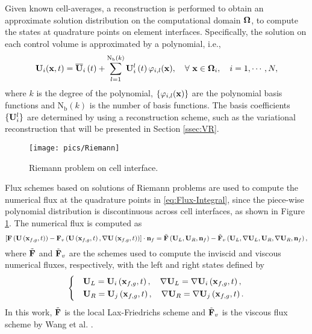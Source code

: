Given known cell-averages, a reconstruction is performed to obtain an approximate solution distribution on the computational domain $\mathbf{\Omega}$, to compute the states at quadrature points on element interfaces. Specifically, the solution on each control volume is approximated by a polynomial, i.e.,
\begin{equation}
    \label{eq:FVRec}
    \mathbf{U}_i(\mathbf{x},t) = \overline{\mathbf{U}}_i \left(t\right) + \sum_{l=1}^{\mathrm{N_b}(k)}{\mathbf{U}_i^l \left(t\right) \varphi_{i,l}(\mathbf{x}) }, \quad \forall \ \mathbf{x} \in \mathbf{\Omega}_i, \quad i=1, \cdots, N,
\end{equation}
where $k$ is the degree of the polynomial, $\{\varphi_{i,l}(\mathbf{x})\}$ are the polynomial basis functions and $\mathrm{N_b}(k)$ is the number of basis functions. The basis coefficients $\{\mathbf{U}^l_i\}$ are determined by using a reconstruction scheme, such as the variational reconstruction \cite{wang2017compact_VR} that will be presented in Section \ref{ssec:VR}. 

\begin{figure}[htbp!]
	\centering
	\texttt{[image: pics/Riemann]}
	\caption{Riemann problem on cell interface.}
	\label{fig:Riemann}
\end{figure}

Flux schemes based on solutions of Riemann problems are used to compute the numerical flux at the quadrature points in \eqref{eq:Flux-Integral}, since the piece-wise polynomial distribution is discontinuous across cell interfaces, as shown in Figure \ref{fig:Riemann}.  
The numerical flux is computed as
\begin{equation}
	\label{eq:num-flux}
	\left[\mathbf{F} \left(\mathbf{U} \left(\mathbf{x}_{f,g},t\right)\right) - \mathbf{F}_v \left(\mathbf{U}\left(\mathbf{x}_{f,g},t\right), \nabla \mathbf{U} \left(\mathbf{x}_{f,g},t\right)\right)\right] \cdot \mathbf{n}_f = \tilde{\mathbf{F}} \left(\mathbf{U}_L, \mathbf{U}_R,\mathbf{n}_f\right)- \tilde{\mathbf{F}}_v \left(\mathbf{U}_L, \nabla \mathbf{U}_L, \mathbf{U}_R, \nabla \mathbf{U}_R, \mathbf{n}_f\right),
\end{equation}
where $\tilde{\mathbf{F}}$ and $\tilde{\mathbf{F}}_v$ are the schemes used to compute the inviscid and viscous numerical fluxes, respectively, with the left and right states defined by
\begin{equation}
	\begin{dcases}
		&\mathbf{U}_L= \mathbf{U}_i\left(\mathbf{x}_{f,g},t \right), \quad \nabla \mathbf{U}_L= \nabla \mathbf{U}_i\left(\mathbf{x}_{f,g},t \right),\\
		&\mathbf{U}_R= \mathbf{U}_j\left(\mathbf{x}_{f,g} ,t \right), \quad \nabla \mathbf{U}_R= \nabla \mathbf{U}_j\left(\mathbf{x}_{f,g},t \right).
	\end{dcases}
\end{equation}
In this work, $\tilde{\mathbf{F}}$ is the local Lax-Friedrichs scheme and $\tilde{\mathbf{F}}_v$ is the viscous flux scheme by Wang et al. \cite{wang2017compact_VR}.

